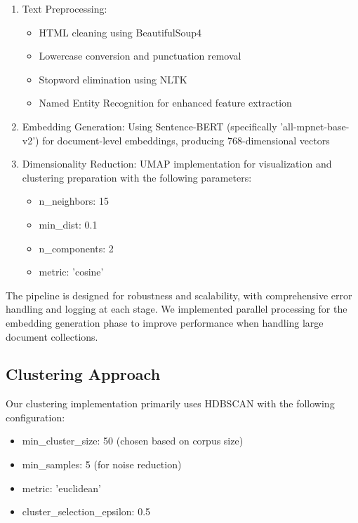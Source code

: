 \documentclass[conference]{IEEEtran}
\begin{document}
\begin{enumerate}
    \item Text Preprocessing: 
        \begin{itemize}
            \item HTML cleaning using BeautifulSoup4
            \item Lowercase conversion and punctuation removal
            \item Stopword elimination using NLTK
            \item Named Entity Recognition for enhanced feature extraction
        \end{itemize}
    \item Embedding Generation: Using Sentence-BERT \cite{reimers2019sentence} (specifically 'all-mpnet-base-v2') for document-level embeddings, producing 768-dimensional vectors
    \item Dimensionality Reduction: UMAP \cite{mcinnes2017umap} implementation for visualization and clustering preparation with the following parameters:
        \begin{itemize}
            \item n\_neighbors: 15
            \item min\_dist: 0.1
            \item n\_components: 2
            \item metric: 'cosine'
        \end{itemize}
\end{enumerate}

The pipeline is designed for robustness and scalability, with comprehensive error handling and logging at each stage. We implemented parallel processing for the embedding generation phase to improve performance when handling large document collections.

\subsection{Clustering Approach}
Our clustering implementation primarily uses HDBSCAN \cite{campello2013density} with the following configuration:
\begin{itemize}
    \item min\_cluster\_size: 50 (chosen based on corpus size)
    \item min\_samples: 5 (for noise reduction)
    \item metric: 'euclidean'
    \item cluster\_selection\_epsilon: 0.5
\end{itemize}
\end{document}
